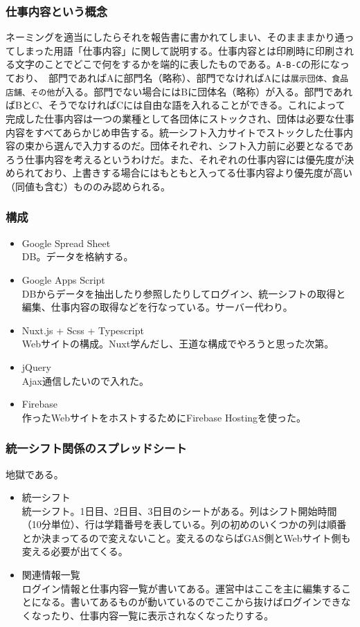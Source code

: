 \documentclass[dvipdfmx,jb5]{jarticle}
\begin{document}
  \subsubsection{仕事内容という概念}
  ネーミングを適当にしたらそれを報告書に書かれてしまい、そのまままかり通ってしまった用語「仕事内容」に関して説明する。仕事内容とは印刷時に印刷される文字のことでどこで何をするかを端的に表したものである。\verb+A-B-C+の形になっており、　部門であればAに部門名（略称）、部門でなければAには\verb+展示団体、食品店舗、その他+が入る。部門でない場合にはBに団体名（略称）が入る。部門であればBとC、そうでなければCには自由な語を入れることができる。これによって完成した仕事内容は一つの業種として各団体にストックされ、団体は必要な仕事内容をすべてあらかじめ申告する。統一シフト入力サイトでストックした仕事内容の束から選んで入力するのだ。団体それぞれ、シフト入力前に必要となるであろう仕事内容を考えるというわけだ。また、それぞれの仕事内容には優先度が決められており、上書きする場合にはもともと入ってる仕事内容より優先度が高い（同値も含む）もののみ認められる。
  \subsubsection{構成}
  \begin{itemize}
  \item Google Spread Sheet\\
  DB。データを格納する。
   \item Google Apps Script\\
   DBからデータを抽出したり参照したりしてログイン、統一シフトの取得と編集、仕事内容の取得などを行なっている。サーバー代わり。
   \item Nuxt.js + Scss + Typescript\\
   Webサイトの構成。Nuxt学んだし、王道な構成でやろうと思った次第。
   \item jQuery\\
   Ajax通信したいので入れた。
   \item Firebase\\
   作ったWebサイトをホストするためにFirebase Hostingを使った。
  \end{itemize}
  \subsubsection{統一シフト関係のスプレッドシート}
  地獄である。
  \begin{itemize}
  \item 統一シフト\\
  統一シフト。1日目、2日目、3日目のシートがある。列はシフト開始時間（10分単位）、行は学籍番号を表している。列の初めのいくつかの列は順番とか決まってるので変えないこと。変えるのならばGAS側とWebサイト側も変える必要が出てくる。
  \item 関連情報一覧\\
  ログイン情報と仕事内容一覧が書いてある。運営中はここを主に編集することになる。書いてあるものが動いているのでここから抜けばログインできなくなったり、仕事内容一覧に表示されなくなったりする。
  \end{itemize}
\end{document}
